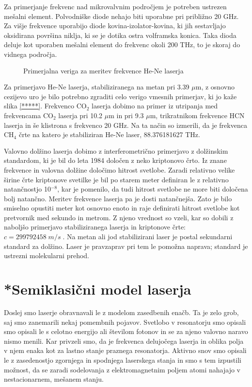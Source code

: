 Za primerjanje frekvenc nad mikrovalvnim področjem je potreben ustrezen
mešalni element. Polvodniške diode nehajo biti uporabne pri približno 20
GHz. Za višje frekvence uporabijo diode kovina-izolator-kovina, ki jih
sestavljajo oksidirana površina niklja, ki se je dotika ostra volframska
konica. Taka dioda deluje kot uporaben mešalni element do frekvenc okoli
200 THz, to je skoraj do vidnega področja.

\begin{figure}[tbp]
\label{s5.14} \vskip 15cm
\caption{Primerjalna veriga za meritev frekvence He-Ne laserja}
\end{figure}

Za primerjavo He-Ne laserja, stabiliziranega na metan pri 3.39 $\mu$m, z
osnovno cezijevo uro je bilo potrebno zgraditi celo verigo vmesnih
primerjav, ki jo kaže slika \ref{*****}. Frekvenco CO$_2$ laserja dobimo na
primer iz utripanja med frekvencama CO$_2$ laserja pri 10.2 $\mu$m in pri
9.3 $\mu$m, trikratnikom frekvence HCN laserja in še klistrona s frekvenco
20 GHz. Na ta način so izmerili, da je frekvenca CH$_4$ črte na katero je
stabiliziran He-Ne laser, 88.376181627 THz.

Valovno dolžino laserja dobimo z interferometrično primerjavo z
dolžinskim standardom, ki je bil do leta 1984 določen z neko kriptonovo
črto. Iz znane frekvence in valovna dolžine določimo hitrost svetlobe.
Zaradi relativno velike širine črte kriptonove svetilke je bil po starem
meter definiran le z relativno natančnostjo 10$^{- 8}$, kar je pomenilo, da
tudi hitrost svetlobe ne more biti določena bolj natančno. Meritev
frekvence laserja pa je dosti natančnejša. Zato je bilo smiselno opustiti
meter kot osnovno enoto in raje definirati hitrost svetlobe kot pretvornik
med sekundo in metrom. Z njeno vrednost so vzeli, kar so dobili z naboljšo
primerjavo stabiliziranega laserja in kriptonove črte: $c=299 792
458\;m/s\;. $ Na metan ali jod stabilizirani laser je postal sekundarni
standard za dolžino. Laser je pravzaprav pri tem le pomožna naprava;
standard je ustrezni molekularni prehod.

\section{*Semiklasični model laserja}

Doslej smo laserje obravnavali le z modelom zasedbenih enačb. Ta je zelo
grob, saj smo zanemarili nekaj pomembnih pojavov. Svetlobo v resonatorju smo
opisali smo opisali le s celotno energijo ali številom fotonov in se za
njeno valovno naravo nismo menili. Kar privzeli smo, da je frekvenca
delujočega laserja in oblika polja v njem enaka kot za lastno stanje
praznega resonatorja. Aktivno snov smo opisali le z zasedenostjo zgornjega
in spodnjega laserskega stanja in smo s tem izpustili možnost, da se zaradi
sodelovanja z elektromagnetnim poljem atomi nahajajo v nestacionarnem,
mešanem stanju.

